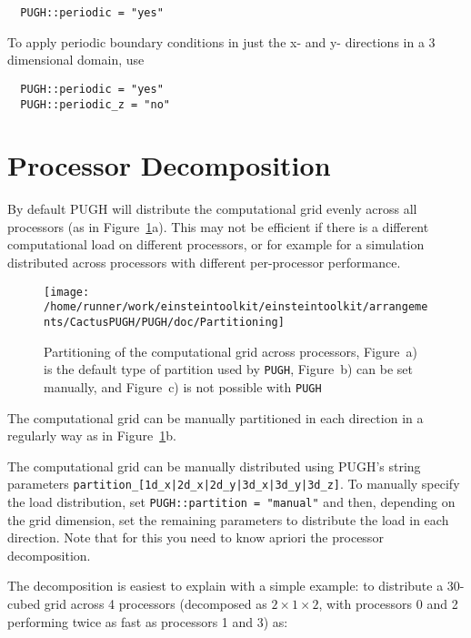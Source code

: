 \documentclass{article}
\begin{document}
\begin{verbatim}
  PUGH::periodic = "yes"
\end{verbatim}

To apply periodic boundary conditions in just the x- and y- directions in
a 3 dimensional domain, use

\begin{verbatim}
  PUGH::periodic = "yes"
  PUGH::periodic_z = "no"
\end{verbatim}


\section{Processor Decomposition}

By default PUGH will distribute the computational grid evenly across
all processors (as in Figure~\ref{pugh::fig2}a). This may not be
efficient if there is a different computational load on different
processors, or for example for a simulation distributed across
processors with different per-processor performance.

\begin{figure}[ht]
\begin{center}
\texttt{[image: /home/runner/work/einsteintoolkit/einsteintoolkit/arrangements/CactusPUGH/PUGH/doc/Partitioning]}
\end{center}
\caption[]{Partitioning of the computational grid across processors, Figure~a) is the default type of partition used by {\tt PUGH}, Figure~b) can be set
manually, and Figure~c) is not possible with {\tt PUGH}}
\label{pugh::fig2}
\end{figure}

The computational grid can be manually partitioned in each direction
in a regularly way as in Figure~\ref{pugh::fig2}b.

The computational grid can be manually distributed using PUGH's
string parameters \verb!partition_[1d_x|2d_x|2d_y|3d_x|3d_y|3d_z]!.
To manually specify the load distribution, set {\tt PUGH::partition = "manual"}
and then, depending on the grid dimension, set the remaining
parameters to distribute the load in each direction. Note that for
this you need to know apriori the processor decomposition.

The decomposition is easiest to explain with a simple example:
to distribute a 30-cubed grid across 4 processors (decomposed as $2 \times 1
\times 2$, with processors 0 and 2 performing twice as fast as processors 1
and 3) as:
\end{document}
